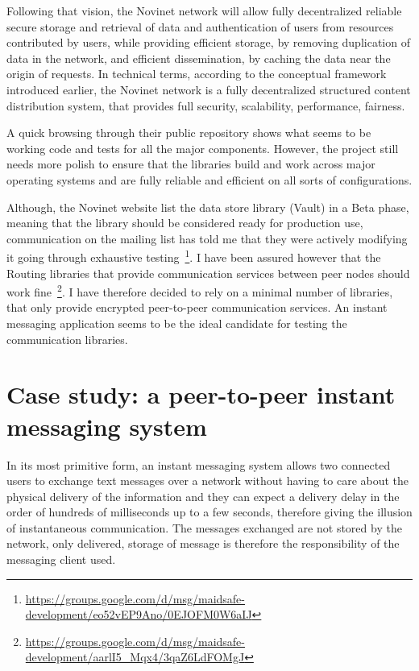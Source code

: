 Following that vision, the Novinet network will allow fully decentralized reliable secure storage and retrieval of data and authentication of users from resources contributed by users, while providing efficient storage, by removing duplication of data in the network, and efficient dissemination, by caching the data near the origin of requests. In technical terms, according to the conceptual framework introduced earlier, the Novinet network is a fully decentralized structured content distribution system, that provides full security, scalability, performance, fairness.

A quick browsing through their public repository shows what seems to be working code and tests for all the major components. However, the project still needs more polish to ensure that the libraries build and work across major operating systems and are fully reliable and efficient on all sorts of configurations.

Although, the Novinet website list the data store library (Vault) in a Beta phase, meaning that the library should be considered ready for production use, communication on the mailing list has told me that they were actively modifying it going through exhaustive testing~\footnote{\url{https://groups.google.com/d/msg/maidsafe-development/eo52vEP9Ano/0EJOFM0W6aIJ}}. I have been assured however that the Routing libraries that provide communication services between peer nodes should work fine~\footnote{\url{https://groups.google.com/d/msg/maidsafe-development/aarlI5_Mqx4/3qaZ6LdFOMgJ}}. I have therefore decided to rely on a minimal number of libraries, that only provide encrypted peer-to-peer communication services. An instant messaging application seems to be the ideal candidate for testing the communication libraries.

\section{Case study: a peer-to-peer instant messaging system}

In its most primitive form, an instant messaging system allows two connected users to exchange text messages over a network without having to care about the physical delivery of the information and they can expect a delivery delay in the order of hundreds of milliseconds up to a few seconds, therefore giving the illusion of instantaneous communication. The messages exchanged are not stored by the network, only delivered, storage of message is therefore the responsibility of the messaging client used.

